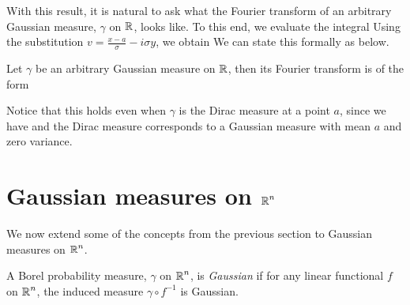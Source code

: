\documentclass[../main.tex]{subfiles}
\begin{document}
With this result, it is natural to ask what the Fourier transform of an arbitrary Gaussian measure, $\gamma$ on $\operatorname{\mathbb{R}}$, looks like. To this end, we evaluate the integral  Using the substitution $v = \frac{x-a}{\sigma} - i\sigma y$, we obtain  We can state this formally as below.
\begin{proposition}
\label{prop:gauss_ft}
Let $\gamma$ be an arbitrary Gaussian measure on $\operatorname{\mathbb{R}}$, then its Fourier transform is of the form 
\end{proposition}
\begin{remark}
Notice that this holds even when $\gamma$ is the Dirac measure at a point $a$, since we have  and the Dirac measure corresponds to a Gaussian measure with mean $a$ and zero variance.
\end{remark}

\section{Gaussian measures on \texorpdfstring{$\operatorname{\mathbb{R}}^n$}{Rn}}

We now extend some of the concepts from the previous section to Gaussian measures on $\operatorname{\mathbb{R}}^n$.
\begin{definition}
\label{def:gauss_Rn}
A Borel probability measure, $\gamma$ on $\operatorname{\mathbb{R}}^n$, is \emph{Gaussian} if for any linear functional $f$ on $\operatorname{\mathbb{R}}^n$, the induced measure $\gamma\circ f^{-1}$ is Gaussian.
\end{definition}
\end{document}
